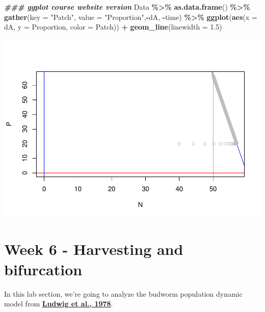 \documentclass[
]{book}
\newenvironment{Shaded}{\begin{snugshade}}{\end{snugshade}}
\newcommand{\AttributeTok}[1]{\textcolor[rgb]{0.13,0.29,0.53}{#1}}
\newcommand{\DocumentationTok}[1]{\textcolor[rgb]{0.56,0.35,0.01}{\textbf{\textit{#1}}}}
\newcommand{\FloatTok}[1]{\textcolor[rgb]{0.00,0.00,0.81}{#1}}
\newcommand{\FunctionTok}[1]{\textcolor[rgb]{0.13,0.29,0.53}{\textbf{#1}}}
\newcommand{\NormalTok}[1]{#1}
\newcommand{\SpecialCharTok}[1]{\textcolor[rgb]{0.81,0.36,0.00}{\textbf{#1}}}
\newcommand{\StringTok}[1]{\textcolor[rgb]{0.31,0.60,0.02}{#1}}
\begin{document}
\begin{Shaded}
\begin{Highlighting}[]
\DocumentationTok{\#\#\# ggplot course website version}
\NormalTok{Data }\SpecialCharTok{\%\textgreater{}\%}
  \FunctionTok{as.data.frame}\NormalTok{() }\SpecialCharTok{\%\textgreater{}\%}
  \FunctionTok{gather}\NormalTok{(}\AttributeTok{key =} \StringTok{"Patch"}\NormalTok{, }\AttributeTok{value =} \StringTok{"Proportion"}\NormalTok{,}\SpecialCharTok{{-}}\NormalTok{dA, }\SpecialCharTok{{-}}\NormalTok{time) }\SpecialCharTok{\%\textgreater{}\%}
  \FunctionTok{ggplot}\NormalTok{(}\FunctionTok{aes}\NormalTok{(}\AttributeTok{x =}\NormalTok{ dA, }\AttributeTok{y =}\NormalTok{ Proportion, }\AttributeTok{color =}\NormalTok{ Patch)) }\SpecialCharTok{+}
  \FunctionTok{geom\_line}\NormalTok{(}\AttributeTok{linewidth =} \FloatTok{1.5}\NormalTok{)}
\end{Highlighting}
\end{Shaded}

\includegraphics{bookdown-demo_files/figure-latex/unnamed-chunk-27-1.pdf}

\hypertarget{week-6---harvesting-and-bifurcation}{%
\chapter*{Week 6 - Harvesting and bifurcation}\label{week-6---harvesting-and-bifurcation}}

In this lab section, we're going to analyze the budworm population
dynamic model from \href{https://doi.org/10.2307/3939}{\textbf{Ludwig et al.,
1978}}.
\end{document}
